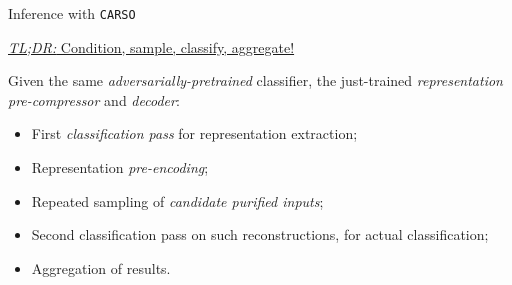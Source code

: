 {\begin{frame}{ Inference with \texttt{CARSO}}
\begin{minipage}[]{0.45\textwidth}
    \begin{center}
        \underline{\textit{TL;DR:} Condition, sample, classify, aggregate!}
    \end{center}

    Given the same \textit{adversarially-pretrained} classifier, the just-trained \textit{representation pre-compressor} and \textit{decoder}:
    \hfill\break
    \begin{itemize}
        \item First \textit{classification pass} for representation \alert{extraction};
        \item Representation \textit{pre-encoding};
        \item \alert{Repeated sampling} of \textit{candidate purified inputs};
        \item Second classification pass on such reconstructions, for \alert{actual classification};
        \item \alert{Aggregation} of results.
    \end{itemize}
    \end{minipage}
    \end{frame}



}
